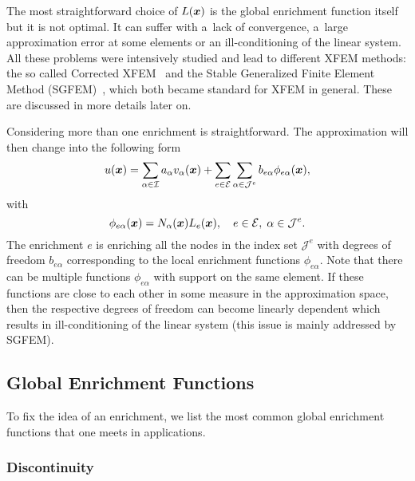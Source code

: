
The most straightforward choice of $L(\mathbf{\boldsymbol{x}})$ is the global enrichment function itself but it is not optimal. It can suffer with a~lack of convergence, a~large approximation error at some elements or an ill-conditioning of the linear system.
All these problems were intensively studied and lead to different XFEM methods:
the so called Corrected XFEM~\cite{fries_corrected_2008}
and the Stable Generalized Finite Element Method (SGFEM)~\cite{babuska_stable_2012, gupta_stable_2013}, which 
both became standard for XFEM in general. These are discussed in more details later on.

Considering more than one enrichment is straightforward. The approximation will then change into the following form
\begin{equation} \label{eqn:soa_xfem_standard_form_mult1}
    u(\mathbf{\boldsymbol{x}}) = \sum_{\alpha\in\mathcal{I}}a_\alpha v_\alpha(\mathbf{\boldsymbol{x}})
        + \sum_{e\in\mathcal{E}}\sum_{\alpha\in\mathcal{J}^e} b_{e\alpha} \phi_{e\alpha}(\mathbf{\boldsymbol{x}}),
\end{equation}
with
\begin{equation} \label{eqn:soa_xfem_standard_form_mult2}
    \phi_{e\alpha}(\mathbf{\boldsymbol{x}}) = N_\alpha(\mathbf{\boldsymbol{x}})L_e(\mathbf{\boldsymbol{x}}), \quad e\in\mathcal{E},\; \alpha\in\mathcal{J}^e.
\end{equation}
The enrichment $e$ is enriching all the nodes in the index set $\mathcal{J}^e$ with degrees of freedom $b_{e\alpha}$
corresponding to the local enrichment functions $\phi_{e\alpha}$. Note that there can be multiple functions $\phi_{e\alpha}$ with support on the same element. If these functions are close to each other in some measure in the approximation space, then the respective degrees of freedom can become linearly dependent which results in ill-conditioning of the linear system (this issue is mainly addressed by SGFEM).

\subsection{Global Enrichment Functions} \label{sec:global_enrichment}
To fix the idea of an enrichment, we list the most common global enrichment functions that one meets in applications.

\subsubsection{Discontinuity} \label{sec:glob_enr_discontinuity}

